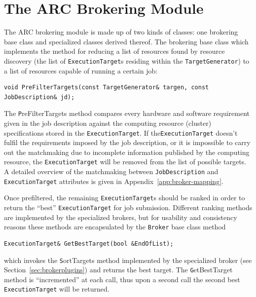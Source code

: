 \documentclass{book}
\newcommand{\Broker}{\texttt{Broker}}
\newcommand{\ExecutionTarget}{\texttt{ExecutionTarget}}
\newcommand{\JobDescription}{\texttt{JobDescription}}
\newcommand{\TargetGenerator}{\texttt{TargetGenerator}}
\begin{document}
\chapter{The ARC Brokering Module}
\label{sec:brokering}
The ARC brokering module is made up of two kinds of classes: one
brokering base class and specialized classes derived thereof. The
brokering base class which implements the method for reducing a list
of resources found by resource discovery (the list of
{\ExecutionTarget}s residing within the {\TargetGenerator}) to a list
of resources capable of running a certain job:

\begin{shaded}
\begin{verbatim}
void PreFilterTargets(const TargetGenerator& targen, const JobDescription& jd);
\end{verbatim}
\end{shaded}

The {\texttt PreFilterTargets} method compares every hardware and
software requirement given in the job description against the
computing resource (cluster) specifications stored in the
{\ExecutionTarget}. If the{\ExecutionTarget} doesn't fulfil the
requirements imposed by the job description, or it is impossible to
carry out the matchmaking due to incomplete information published by
the computing resource, the {\ExecutionTarget} will be removed from
the list of possible targets. A detailed overview of the matchmaking
between {\JobDescription} and {\ExecutionTarget} attributes is given
in Appendix~\ref{app:broker-mapping}.
 
Once prefiltered, the remaining {\ExecutionTarget}s should be ranked
in order to return the ``best'' {\ExecutionTarget} for job
submission. Different ranking methods are implemented by the
specialized brokers, but for usability and consistency reasons these
methods are encapsulated by the {\Broker} base class method

\begin{shaded}
\begin{verbatim}
ExecutionTarget& GetBestTarget(bool &EndOfList);
\end{verbatim}
\end{shaded}

which invokes the {\texttt SortTargets} method implemented by the
specialized broker (see Section~\ref{sec:brokerplugins}) and returns
the best target. The {\texttt GetBestTarget} method is ``incremented''
at each call, thus upon a second call the second best
{\ExecutionTarget} will be returned.
\end{document}
